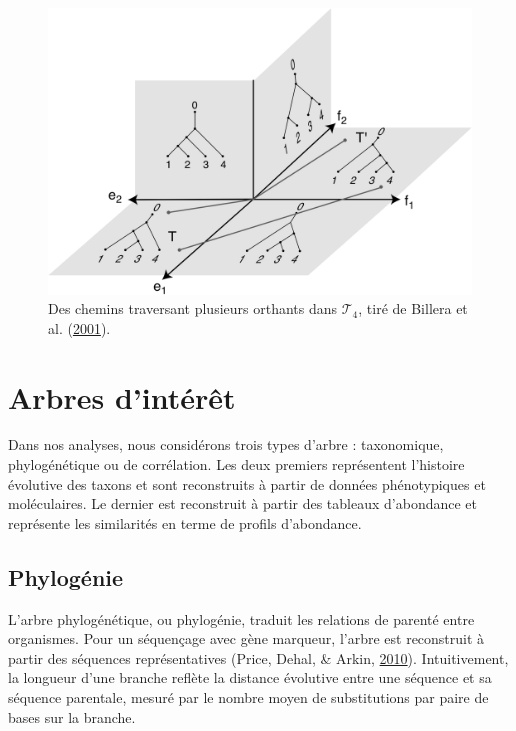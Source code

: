 \documentclass[12pt,a4paper]{reedthesis}
\theoremstyle{definition}
\theoremstyle{definition}
\theoremstyle{definition}
\theoremstyle{remark}
\begin{document}
\begin{figure}

{\centering \includegraphics[width=0.9\linewidth]{img/bhv_dist} 

}

\caption{Des chemins traversant plusieurs orthants dans \(\mathscr{T}_4\), tiré de Billera et al. (\protect\hyperlink{ref-billera2001geometry}{2001}).}\label{fig:bhvdist}
\end{figure}
\hypertarget{arbres-dintuxe9ruxeat}{%
\section{Arbres d'intérêt}\label{arbres-dintuxe9ruxeat}}

Dans nos analyses, nous considérons trois types d'arbre : taxonomique, phylogénétique ou de corrélation. Les deux premiers représentent l'histoire évolutive des taxons et sont reconstruits à partir de données phénotypiques et moléculaires. Le dernier est reconstruit à partir des tableaux d'abondance et représente les similarités en terme de profils d'abondance.

\hypertarget{phyloguxe9nie}{%
\subsection{Phylogénie}\label{phyloguxe9nie}}

L'arbre phylogénétique, ou phylogénie, traduit les relations de parenté entre organismes. Pour un séquençage avec gène marqueur, l'arbre est reconstruit à partir des séquences représentatives (Price, Dehal, \& Arkin, \protect\hyperlink{ref-price2010fasttree}{2010}). Intuitivement, la longueur d'une branche reflète la distance évolutive entre une séquence et sa séquence parentale, mesuré par le nombre moyen de substitutions par paire de bases sur la branche.
\end{document}
